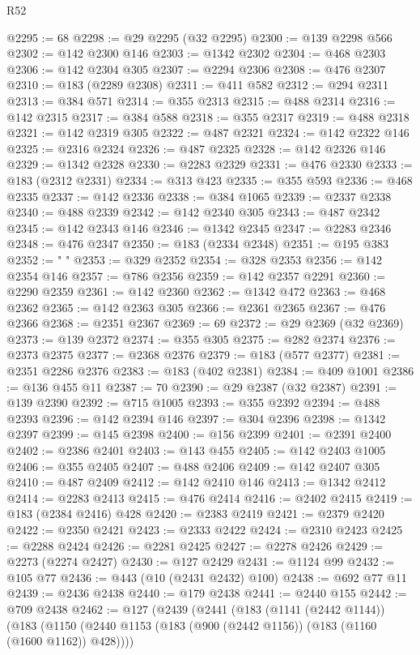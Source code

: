 \begin{lexlean}{R52}
\begin{coremodule}
{{{{{{{{{{{{{{{{{{{{{{{{{{{{{{{{{{{{{{{{{{{{{{{{{{{{{{{{{{{{{{{{{{{{{{{{{{{{{{{{{{{{{{{{{{{{{{{{{{{{{{{{{{{{{{{{{{{{{{{{{{{{{{{{{{{{{{{{{{{{{{{{{{{{{{{{{{{{{{{{{{{{{{{{{{{{{{{{{{{{{{{{{{{{{{{{{{{{{{@2295 := 68
@2298 := @29 @2295 (@32 @2295)
@2300 := @139 @2298 @566
@2302 := @142 @2300 @146
@2303 := @1342 @2302
@2304 := @468 @2303
@2306 := @142 @2304 @305
@2307 := @2294 @2306
@2308 := @476 @2307
@2310 := @183 (@2289 @2308)
@2311 := @411 @582
@2312 := @294 @2311
@2313 := @384 @571
@2314 := @355 @2313
@2315 := @488 @2314
@2316 := @142 @2315
@2317 := @384 @588
@2318 := @355 @2317
@2319 := @488 @2318
@2321 := @142 @2319 @305
@2322 := @487 @2321
@2324 := @142 @2322 @146
@2325 := @2316 @2324
@2326 := @487 @2325
@2328 := @142 @2326 @146
@2329 := @1342 @2328
@2330 := @2283 @2329
@2331 := @476 @2330
@2333 := @183 (@2312 @2331)
@2334 := @313 @423
@2335 := @355 @593
@2336 := @468 @2335
@2337 := @142 @2336
@2338 := @384 @1065
@2339 := @2337 @2338
@2340 := @488 @2339
@2342 := @142 @2340 @305
@2343 := @487 @2342
@2345 := @142 @2343 @146
@2346 := @1342 @2345
@2347 := @2283 @2346
@2348 := @476 @2347
@2350 := @183 (@2334 @2348)
@2351 := @195 @383
@2352 := " "
@2353 := @329 @2352
@2354 := @328 @2353
@2356 := @142 @2354 @146
@2357 := @786 @2356
@2359 := @142 @2357 @2291
@2360 := @2290 @2359
@2361 := @142 @2360
@2362 := @1342 @472
@2363 := @468 @2362
@2365 := @142 @2363 @305
@2366 := @2361 @2365
@2367 := @476 @2366
@2368 := @2351 @2367
@2369 := 69
@2372 := @29 @2369 (@32 @2369)
@2373 := @139 @2372
@2374 := @355 @305
@2375 := @282 @2374
@2376 := @2373 @2375
@2377 := @2368 @2376
@2379 := @183 (@577 @2377)
@2381 := @2351 @2286 @2376
@2383 := @183 (@402 @2381)
@2384 := @409 @1001
@2386 := @136 @455 @11
@2387 := 70
@2390 := @29 @2387 (@32 @2387)
@2391 := @139 @2390
@2392 := @715 @1005
@2393 := @355 @2392
@2394 := @488 @2393
@2396 := @142 @2394 @146
@2397 := @304 @2396
@2398 := @1342 @2397
@2399 := @145 @2398
@2400 := @156 @2399
@2401 := @2391 @2400
@2402 := @2386 @2401
@2403 := @143 @455
@2405 := @142 @2403 @1005
@2406 := @355 @2405
@2407 := @488 @2406
@2409 := @142 @2407 @305
@2410 := @487 @2409
@2412 := @142 @2410 @146
@2413 := @1342 @2412
@2414 := @2283 @2413
@2415 := @476 @2414
@2416 := @2402 @2415
@2419 := @183 (@2384 @2416) @428
@2420 := @2383 @2419
@2421 := @2379 @2420
@2422 := @2350 @2421
@2423 := @2333 @2422
@2424 := @2310 @2423
@2425 := @2288 @2424
@2426 := @2281 @2425
@2427 := @2278 @2426
@2429 := @2273 (@2274 @2427)
@2430 := @127 @2429
@2431 := @1124 @99
@2432 := @105 @77
@2436 := @443 (@10 (@2431 @2432) @100)
@2438 := @692 @77 @11
@2439 := @2436 @2438
@2440 := @179 @2438
@2441 := @2440 @155
@2442 := @709 @2438
@2462 := @127
    (@2439
      (@2441
        (@183
          (@1141 (@2442 @1144))
          (@183
            (@1150 (@2440 @1153 (@183 (@900 (@2442 @1156)) (@183 (@1160 (@1600 @1162)) @428))))
}}}}}}}}}}}}}}}}}}}}}}}}}}}}}}}}}}}}}}}}}}}}}}}}}}}}}}}}}}}}}}}}}}}}}}}}}}}}}}}}}}}}}}}}}}}}}}}}}}}}}}}}}}}}}}}}}}}}}}}}}}}}}}}}}}}}}}}}}}}}}}}}}}}}}}}}}}}}}}}}}}}}}}}}}}}}}}}}}}}}}}}}}}}}}}}}}}}}}}
\end{coremodule}
\end{lexlean}
